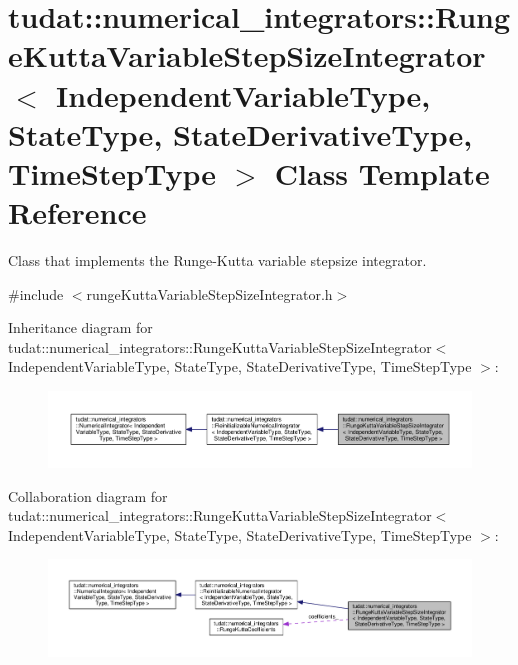 \hypertarget{classtudat_1_1numerical__integrators_1_1RungeKuttaVariableStepSizeIntegrator}{}\section{tudat\+:\+:numerical\+\_\+integrators\+:\+:Runge\+Kutta\+Variable\+Step\+Size\+Integrator$<$ Independent\+Variable\+Type, State\+Type, State\+Derivative\+Type, Time\+Step\+Type $>$ Class Template Reference}
\label{classtudat_1_1numerical__integrators_1_1RungeKuttaVariableStepSizeIntegrator}


Class that implements the Runge-\/\+Kutta variable stepsize integrator.  




{\ttfamily \#include $<$runge\+Kutta\+Variable\+Step\+Size\+Integrator.\+h$>$}



Inheritance diagram for tudat\+:\+:numerical\+\_\+integrators\+:\+:Runge\+Kutta\+Variable\+Step\+Size\+Integrator$<$ Independent\+Variable\+Type, State\+Type, State\+Derivative\+Type, Time\+Step\+Type $>$\+:
\nopagebreak
\begin{figure}[H]
\begin{center}
\leavevmode
\includegraphics[width=350pt]{classtudat_1_1numerical__integrators_1_1RungeKuttaVariableStepSizeIntegrator__inherit__graph}
\end{center}
\end{figure}


Collaboration diagram for tudat\+:\+:numerical\+\_\+integrators\+:\+:Runge\+Kutta\+Variable\+Step\+Size\+Integrator$<$ Independent\+Variable\+Type, State\+Type, State\+Derivative\+Type, Time\+Step\+Type $>$\+:
\nopagebreak
\begin{figure}[H]
\begin{center}
\leavevmode
\includegraphics[width=350pt]{classtudat_1_1numerical__integrators_1_1RungeKuttaVariableStepSizeIntegrator__coll__graph}
\end{center}
\end{figure}

